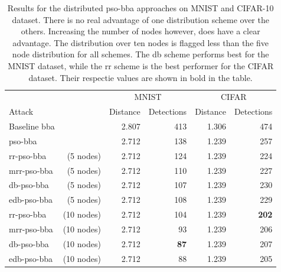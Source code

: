 \begin{table}
	\centering
	\caption[Distributed PSO-BBA results]{Results for the distributed \gls{pso}-\gls{bba} approaches on MNIST and CIFAR-10 dataset. There is no real advantage of one distribution scheme over the others. Increasing the number of nodes however, does have a clear advantage. The distribution over ten nodes is flagged less than the five node distribution for all schemes. The \gls{db} scheme performs best for the MNIST dataset, while the \gls{rr} scheme is the best performer for the CIFAR dataset. Their respectie values are shown in bold in the table.}
	\label{tbl:d_pso_bba}
	\begin{tabular}{lrrrrr}\toprule
			&& \multicolumn{2}{c}{MNIST} &\multicolumn{2}{c}{CIFAR} \\ \cmidrule(r){3-4} \cmidrule(r){5-6}
	Attack				&&Distance	&Detections	&Distance	&Detections \\ \midrule
	Baseline \gls{bba}							&&2.807	&413	&1.306	&474 \\
	\gls{pso}-\gls{bba} 						&&2.712	&138	&1.239	&257 \\ \addlinespace[\linespace] 
	\gls{rr}-\gls{pso}-\gls{bba} &(5 nodes) 		&2.712	&124	&1.239	&224 \\
	\gls{mrr}-\gls{pso}-\gls{bba} &(5 nodes)		&2.712	&110	&1.239	&227 \\
	\gls{db}-\gls{pso}-\gls{bba} &(5 nodes)		&2.712	&107	&1.239	&230 \\
	\gls{edb}-\gls{pso}-\gls{bba} &(5 nodes)		&2.712	&108	&1.239	&229 \\ \addlinespace[\linespace] 
	\gls{rr}-\gls{pso}-\gls{bba} &(10 nodes) 	&2.712	&104	&1.239	&\textbf{202} \\
	\gls{mrr}-\gls{pso}-\gls{bba} &(10 nodes)	&2.712	&93		&1.239	&206 \\
	\gls{db}-\gls{pso}-\gls{bba} &(10 nodes)		&2.712	&\textbf{87}		&1.239	&207 \\
	\gls{edb}-\gls{pso}-\gls{bba} &(10 nodes)	&2.712	&88		&1.239	&205 \\
	\bottomrule
	\end{tabular}
\end{table}

